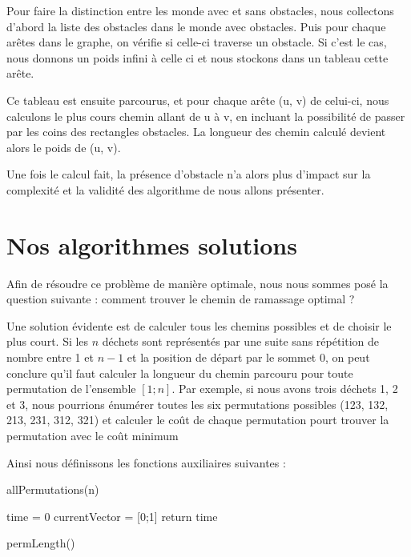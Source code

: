 \documentclass{article}
\begin{document}
Pour faire la distinction entre les monde avec et sans obstacles, nous collectons d'abord la liste des obstacles dans le monde avec obstacles. Puis pour chaque arêtes dans le graphe,
on v\'erifie si celle-ci traverse un obstacle. Si c'est le cas, nous donnons un poids infini à celle ci et nous stockons dans un tableau cette arête.

Ce tableau est ensuite parcourus, et pour chaque arête (u, v) de celui-ci, nous calculons le plus cours chemin allant de u à v, en incluant la possibilité de passer par les coins des rectangles obstacles. La longueur des chemin calculé devient alors le poids de (u, v).

Une fois le calcul fait, la présence d'obstacle n'a alors plus d'impact sur la complexité et la validité des algorithme de nous allons présenter.

\section{Nos algorithmes solutions}

Afin de résoudre ce problème de manière optimale, nous nous sommes posé la question suivante : comment trouver le chemin de ramassage optimal ?

Une solution évidente est de calculer tous les chemins possibles et de choisir le plus court. Si les $n$ déchets sont représentés par une suite sans répétition de nombre entre 1 et $n - 1$ et la position de départ par le sommet 0, on peut conclure qu'il faut calculer la longueur du chemin parcouru pour toute permutation de l'ensemble $[1 ; n]$.
Par exemple, si nous avons trois d\'echets 1, 2 et 3, nous pourrions \'enum\'erer toutes les six permutations possibles (123, 132, 213, 231, 312, 321) et calculer le co\^ut de chaque permutation pourt trouver la permutation avec le co\^ut minimum

Ainsi nous définissons les fonctions auxiliaires suivantes : \\

\begin{algorithm}
  \SetAlgoLined
  \caption{allPermutations(n)}
\end{algorithm}

\begin{algorithm}
    \SetAlgoLined
    time = 0\;
    currentVector = [0;1]\;
    return time\;
    \caption{permLength()}
  \end{algorithm}
\end{document}
